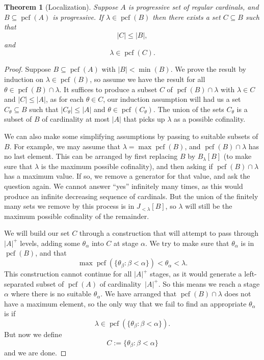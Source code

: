 \documentclass[10pt]{amsart}
\theoremstyle{plain}
\newtheorem{theorem}{Theorem}
\theoremstyle{definition}
\theoremstyle{remark}
\DeclareMathOperator{\pcf}{pcf}
\numberwithin{equation}{section}
\begin{document}
\begin{theorem}[Localization]
Suppose $A$ is progressive set of regular cardinals, and $B\subseteq\pcf(A)$ is progressive.  If $\lambda\in\pcf(B)$ then there exists
a set $C\subseteq B$ such that
\begin{equation}
|C|\leq |B|,
\end{equation}
and
\begin{equation}
\lambda\in\pcf(C).
\end{equation}
\end{theorem}
\begin{proof}
Suppose $B\subseteq \pcf(A)$ with $|B|<\min(B)$. We prove the result by induction on $\lambda\in\pcf(B)$, so assume we have the result
for all $\theta\in\pcf(B)\cap\lambda$.   It suffices to produce a subset $C$ of $\pcf(B)\cap\lambda$ with $\lambda\in C$ and $|C|\leq|A|$,
as for each $\theta\in C$, our induction assumption will had us a set $C_\theta\subseteq B$ such that $|C_\theta|\leq |A|$ and $\theta\in\pcf(C_\theta)$.
The union of the sets $C_\theta$ is a subset of $B$ of cardinality at most $|A|$ that picks up $\lambda$ as a possible cofinality.

We can also make some simplifying assumptions by passing to suitable subsets of $B$. For example, we may assume that
 $\lambda = \max\pcf(B)$, and $\pcf(B)\cap\lambda$ has no last element. This can be arranged by first replacing
$B$ by $B_\lambda[B]$ (to make sure that $\lambda$ is the maximum possible cofinality), and then asking if $\pcf(B)\cap\lambda$ has
 a maximum value. If so, we remove a generator for that value, and ask the question again.  We cannot answer ``yes''
  infinitely many times, as this would produce an infinite decreasing sequence of cardinals. But the union of the finitely many sets
   we remove by this process is in $J_{<\lambda}[B]$, so $\lambda$ will still be the maximum possible cofinality of the remainder.


We will build our set $C$ through a construction that will attempt to pass through $|A|^+$ levels, adding some $\theta_\alpha$ into $C$
at stage $\alpha$.  We try to make sure that $\theta_\alpha$ is in $\pcf(B)$, and that
\begin{equation}
\max\pcf(\{\theta_\beta:\beta<\alpha\})<\theta_\alpha<\lambda.
\end{equation}
This construction cannot continue for all $|A|^+$ stages, as it would generate a left-separated subset of $\pcf(A)$ of cardinality~$|A|^+$.
So this means we reach a stage $\alpha$ where there is no suitable $\theta_\alpha$.  We have arranged that $\pcf(B)\cap\lambda$ does not
have a maximum element, so the only way that we fail to find an appropriate $\theta_\alpha$ is if
\begin{equation}
\lambda\in\pcf(\{\theta_\beta:\beta<\alpha\}).
\end{equation}
But now we define
\begin{equation}
C:=\{\theta_\beta:\beta<\alpha\}
\end{equation}
and we are done.
\end{proof}
\end{document}
